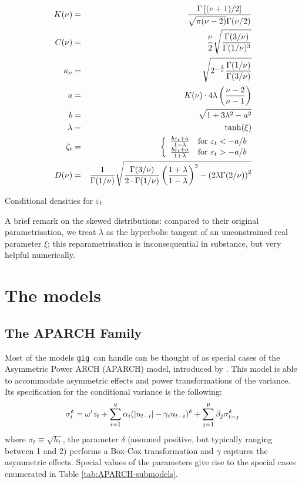 \documentclass[a4paper,11pt]{article}
\newcommand{\stdu}{\ensuremath \varepsilon}
\newcommand{\uhat}{\ensuremath u}
\newcommand{\gig}{\texttt{gig}}
\begin{document}
\begin{table}[hptb]
\begin{eqnarray*}
  K(\nu) & = &
  \frac{\Gamma\left[(\nu + 1)/2\right]}  {\sqrt{\pi (\nu - 2)}\Gamma(\nu/2)} \\
  C(\nu) & = &
  \frac{\nu}{2}\sqrt{\frac{\Gamma(3/\nu)}{\Gamma(1/\nu)^3}} \\
  \kappa_\nu & = &
  \sqrt{2^{-\frac{2}{\nu}}\frac{\Gamma(1/\nu)}{\Gamma(3/\nu)}} \\
  a & = & K(\nu) \cdot 4 \lambda  \left( \frac{\nu - 2}{\nu - 1} \right) \\
  b & = & \sqrt{1 + 3\lambda^2 - a^2} \\
  \lambda & = & \tanh(\xi) \\
  \zeta_t & = & \left\{
    \begin{array}{ll}
        \frac{b \stdu_t + a}{1-\lambda} & \mathrm{for\ } \stdu_t < -a/b \\
        \frac{b \stdu_t + a}{1+\lambda} & \mathrm{for\ } \stdu_t > -a/b
      \end{array}
      \right. \\
  D(\nu) & = & 
  \frac{1}{\Gamma(1/\nu)}\sqrt{\frac{\Gamma(3/\nu)}{2 \cdot \Gamma(1/\nu)}
  \left(\frac{1 + \lambda}{1 - \lambda}\right)^3 - 
  \left(2 \lambda \Gamma(2/\nu)\right)^2 } 
\end{eqnarray*}
  \caption{Conditional densities for $\stdu_t$}
  \label{tab:densities}
\end{table}

A brief remark on the skewed distributions: compared to their original
parametrisation, we treat $\lambda$ as the hyperbolic tangent of an
unconstrained real parameter $\xi$; this reparametrisation is
inconsequential in substance, but very helpful numerically.

\section{The models}
\label{sec:models}

\subsection{The APARCH Family}
\label{sec:APARCH}

Most of the models \gig\ can handle can be thought of as special
cases of the Asymmetric Power ARCH (APARCH) model, introduced by
\cite{Ding-Engle-Granger}. This model is able to accommodate
asymmetric effects and power transformations of the variance. Its
specification for the conditional variance is the following:
\begin{equation} \label{eq:aparch} \sigma_t^\delta = \omega'z_t +
  \sum_{i=1}^q \alpha_i(|\uhat_{t-i}| - \gamma_i
  \uhat_{t-i})^\delta + \sum_{j=1}^p\beta_j\sigma_{t-j}^\delta
\end{equation}
where $\sigma_t \equiv \sqrt{h_t}$, the parameter $\delta$ (assumed
positive, but typically ranging between 1 and 2) performs a Box-Cox
transformation and $\gamma$ captures the asymmetric effects.  Special
values of the parameters give rise to the special cases enumerated in
Table \ref{tab:APARCH-submodels}.
\end{document}

